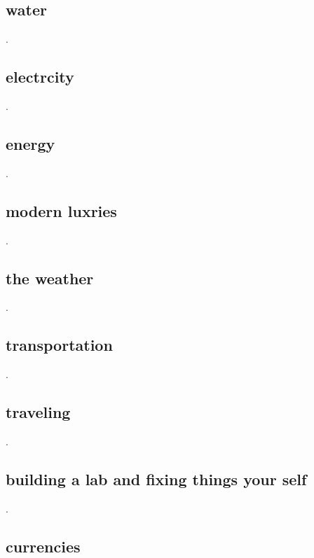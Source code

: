 \documentclass[a4paper,12pt,titlepage]{article}
\begin{document}
\newpage
\begin{centering}
	\section{water}
\end{centering}
.
\newpage
\begin{centering}
	\section{electrcity}
\end{centering}
.
\newpage
\begin{centering}
	\section{energy}
\end{centering}
.
\newpage
\begin{centering}
	\section{modern luxries}
\end{centering}
.
\newpage
\begin{centering}
	\section{the weather}
\end{centering}
.
\newpage
\begin{centering}
	\section{transportation}
\end{centering}
.
\newpage
\begin{centering}
	\section{traveling}
\end{centering}
.
\newpage
\begin{centering}
	\section{building a lab and fixing things your self}
\end{centering}
.
\newpage
\begin{centering}
	\section{currencies}
\end{centering}
\end{document}
